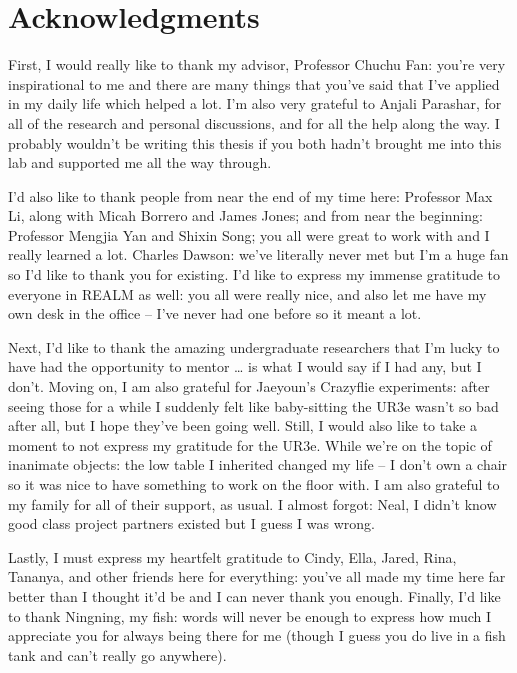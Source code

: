 

\chapter*{Acknowledgments}

First, I would really like to thank my advisor, Professor Chuchu Fan: you’re very inspirational to me and there are many things that you’ve said that I’ve applied in my daily life which helped a lot. I’m also very grateful to Anjali Parashar, for all of the research and personal discussions, and for all the help along the way. I probably wouldn’t be writing this thesis if you both hadn’t brought me into this lab and supported me all the way through.

I’d also like to thank people from near the end of my time here: Professor Max Li, along with Micah Borrero and James Jones; and from near the beginning: Professor Mengjia Yan and Shixin Song; you all were great to work with and I really learned a lot. Charles Dawson: we’ve literally never met but I’m a huge fan so I’d like to thank you for existing. I’d like to express my immense gratitude to everyone in REALM as well: you all were really nice, and also let me have my own desk in the office – I’ve never had one before so it meant a lot.

Next, I’d like to thank the amazing undergraduate researchers that I’m lucky to have had the opportunity to mentor … is what I would say if I had any, but I don’t. Moving on, I am also grateful for Jaeyoun's Crazyflie experiments: after seeing those for a while I suddenly felt like baby-sitting the UR3e wasn’t so bad after all, but I hope they’ve been going well. Still, I would also like to take a moment to not express my gratitude for the UR3e. While we’re on the topic of inanimate objects: the low table I inherited changed my life – I don’t own a chair so it was nice to have something to work on the floor with. I am also grateful to my family for all of their support, as usual. I almost forgot: Neal, I didn’t know good class project partners existed but I guess I was wrong.

Lastly, I must express my heartfelt gratitude to Cindy, Ella, Jared, Rina, Tananya, and other friends here for everything: you’ve all made my time here far better than I thought it’d be and I can never thank you enough. Finally, I’d like to thank Ningning, my fish: words will never be enough to express how much I appreciate you for always being there for me (though I guess you do live in a fish tank and can’t really go anywhere).

